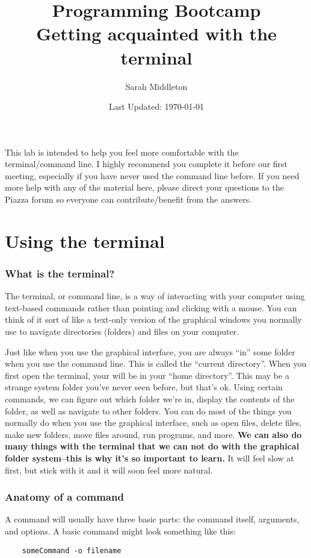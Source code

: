 \documentclass[english,12pt]{article}
\begin{document}
\title{Programming Bootcamp \\ Getting acquainted with the terminal}
\author{Sarah Middleton}
\date{Last Updated: \today}
\maketitle

This lab is intended to help you feel more comfortable with the terminal/command line. I highly recommend you complete it before our first meeting, especially if you have never used the command line before. If you need more help with any of the material here, please direct your questions to the Piazza forum so everyone can contribute/benefit from the answers.

\section{Using the terminal}

\subsubsection*{What is the terminal?}
The terminal, or command line, is a way of interacting with your computer using text-based commands rather than pointing and clicking with a mouse. You can think of it sort of like a text-only version of the graphical windows you normally use to navigate directories (folders) and files on your computer. 

Just like when you use the graphical interface, you are always ``in'' some folder when you use the command line. This is called the ``current directory''. When you first open the terminal, your will be in your ``home directory''. This may be a strange system folder you've never seen before, but that's ok. Using certain commands, we can figure out which folder we're in, display the contents of the folder, as well as navigate to other folders. You can do most of the things you normally do when you use the graphical interface, such as open files, delete files, make new folders, move files around, run programs, and more. \textbf{We can also do many things with the terminal that we can not do with the graphical folder system--this is why it's so important to learn.} It will feel slow at first, but stick with it and it will soon feel more natural.

\subsubsection*{Anatomy of a command}
A command will usually have three basic parts: the command itself, arguments, and options. A basic command might look something like this:
\begin{verbatim}
    someCommand -o filename
\end{verbatim}
\end{document}

